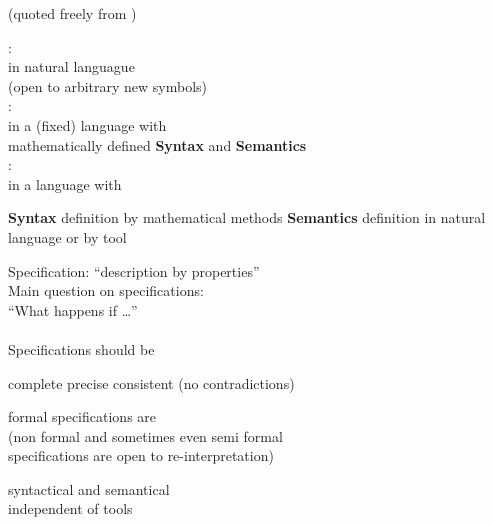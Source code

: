 \documentclass[landscape, slides, light]{mmiss2}[19.02.2002]
\begin{document}
\begin{Package}
\begin{Section}
\begin{Section}[Title={Formal Methods in Software Design},Label=Section1.1]
\begin{Paragraph}[Title={Non Formal, Semi Formal, Formal},Label=Paragraph1.1.1]
(quoted freely from \cite{bowen99})
\end{Paragraph}
\begin{Paragraph}[Label=Paragraph1.1.2]
:\\
in natural languague \\
(open to arbitrary new symbols)\\
\newline
{}: \\
in a (fixed) language with \\
mathematically defined {\bf Syntax} and {\bf Semantics}\\

: \\
in a language with
\begin{List}[Label=List1.1.2,ListType=itemize]
\ListItem
 {{\bf Syntax} definition by mathematical methods}
\ListItem 
{{\bf Semantics} definition in natural language or by tool}
\end{List}
\end{Paragraph}

\begin{Paragraph}[Title=Specifications,Label=Paragraph1.1.3]
Specification: ``description by properties''\\

Main question on specifications:\\
``What happens if \dots'' \\ \\

Specifications should be \pause
\begin{List}[Label=List1.1.3,ListType=itemize]
\ListItem
{complete \pause}
\ListItem
{precise \pause}
\ListItem
{consistent (no contradictions)}
\end{List}
\end{Paragraph}
\begin{Paragraph}[Title={Why formal Specifications?},Label=Paragraph1.1.4]
\begin{List}[Label=List1.1.4,ListType=itemize]
\ListItem
{formal specifications are   \\
          (non formal and sometimes even semi formal \\
          specifications are open to re-interpretation)\pause}


\ListItem
{syntactical and semantical  \\
          independent of tools \pause}


\end{List}
\end{Paragraph}
\end{Section}
\end{Section}
\end{Package}
\end{document}
